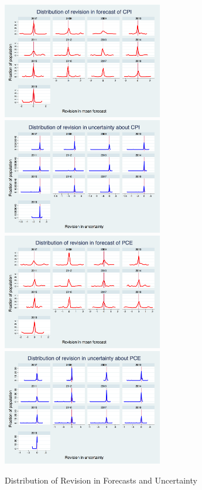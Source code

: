 \documentclass[]{article}
\begin{document}
	
	\begin{figure}[ht]
		\centering
		\includegraphics[width=7cm]{figures/PRCCPIMean01_rv_true_hist.png} 
		\includegraphics[width=7cm]{figures/PRCCPIVar01_rv_true_hist.png}  \\
		\smallskip
		\includegraphics[width=7cm]{figures/PRCPCEMean01_rv_true_hist.png} 
		\includegraphics[width=7cm]{figures/PRCPCEVar01_rv_true_hist.png}  \\
		\caption{Distribution of Revision in Forecasts and Uncertainty}
		\label{RevisionHist}
	\end{figure}
	
\end{document}
